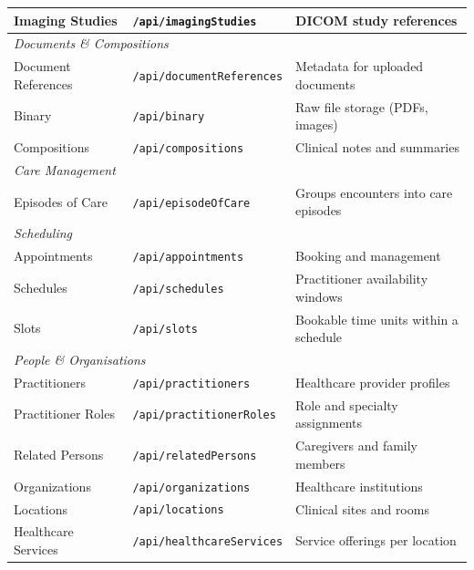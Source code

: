 \begin{table}[H]
\begin{tabular}{|l|l|p{6.2cm}|}
        \hline
        Imaging Studies    & \texttt{/api/imagingStudies}       & DICOM study references \\
        \hline
        \hline
        \multicolumn{3}{|l|}{\textit{Documents \& Compositions}} \\
        \hline
        Document References & \texttt{/api/documentReferences}  & Metadata for uploaded documents \\
        \hline
        Binary             & \texttt{/api/binary}               & Raw file storage (PDFs, images) \\
        \hline
        Compositions       & \texttt{/api/compositions}         & Clinical notes and summaries \\
        \hline
        \hline
        \multicolumn{3}{|l|}{\textit{Care Management}} \\
        \hline
        Episodes of Care   & \texttt{/api/episodeOfCare}        & Groups encounters into care episodes \\
        \hline
        \hline
        \multicolumn{3}{|l|}{\textit{Scheduling}} \\
        \hline
        Appointments       & \texttt{/api/appointments}         & Booking and management \\
        \hline
        Schedules          & \texttt{/api/schedules}            & Practitioner availability windows \\
        \hline
        Slots              & \texttt{/api/slots}                & Bookable time units within a schedule \\
        \hline
        \hline
        \multicolumn{3}{|l|}{\textit{People \& Organisations}} \\
        \hline
        Practitioners      & \texttt{/api/practitioners}        & Healthcare provider profiles \\
        \hline
        Practitioner Roles & \texttt{/api/practitionerRoles}    & Role and specialty assignments \\
        \hline
        Related Persons    & \texttt{/api/relatedPersons}       & Caregivers and family members \\
        \hline
        Organizations      & \texttt{/api/organizations}        & Healthcare institutions \\
        \hline
        Locations          & \texttt{/api/locations}            & Clinical sites and rooms \\
        \hline
        Healthcare Services & \texttt{/api/healthcareServices}  & Service offerings per location \\

\end{tabular}
\end{table}
